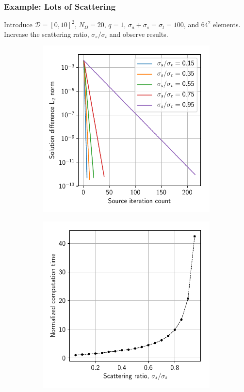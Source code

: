\documentclass[xcolor={usenames,dvipsnames,svgnames,table}]{beamer}
\newcommand{\spatial}{\mathcal{D}} %
\begin{document}
\begin{frame}\frametitle{Example: Lots of Scattering}
	Introduce $\spatial = [0, 10]^2$, $N_\Omega = 20$, $q = 1$, $\sigma_a + \sigma_s = \sigma_t = 100$, and $64^2$ elements. Increase the scattering ratio, $\sigma_s / \sigma_t$ and observe results.

	\begin{figure}[H]
		\centering
		\begin{subfigure}[t]{0.48\textwidth}
				\includegraphics[width=\linewidth]{plots/scattering_norms}
		\end{subfigure}
		\begin{subfigure}[t]{0.48\textwidth}
			\includegraphics[width=\linewidth]{plots/scattering_times}
		\end{subfigure}
	\end{figure}
\end{frame}
\end{document}
